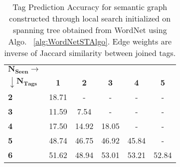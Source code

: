 \begin{table}
\begin{center}
\caption{Tag Prediction Accuracy for semantic graph constructed through local search initialized on spanning tree obtained from WordNet using Algo. ~\ref{alg:WordNetSTAlgo}. Edge weights are inverse of Jaccard similarity between joined tags. }  
\label{tab:TPFlickr117GDWordNetSTJaccardWeight}
\begin{tabular}{|p{2cm}|c|c|c|c|c|}
		\hline
		{$\boldsymbol{N_{Seen} \rightarrow}$} & &  &  &  &\\ 
		{$\boldsymbol{\downarrow N_{Tags}}$} & \textbf{1} & \textbf{2} & \textbf{3} & \textbf{4} & \textbf{5}   \\ 
		\hline 		
		\textbf{2} & 18.71 & - & - & - & -\\ 
		\hline
		\textbf{3} & 11.59 & 7.54 & - & - & -\\ 
		\hline
		\textbf{4} & 17.50 & 14.92 & 18.05 & - & -\\ 
		\hline
		\textbf{5} & 48.74 & 46.75 & 46.92 & 45.84 & -\\ 
		\hline
		\textbf{6} & 51.62 & 48.94 & 53.01 & 53.21 & 52.84 \\ 
		\hline
\end{tabular}
\end{center}
\end{table}








